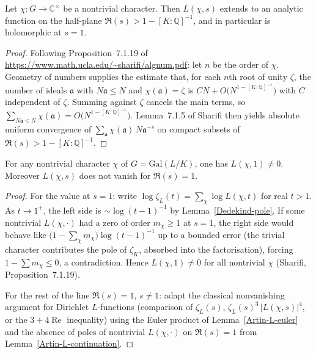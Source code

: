 {\begin{lemma}\label{Artin-L-continuation}
Let $\chi : G \to \mathbb{C}^\times$ be a nontrivial character.  Then $L(\chi,s)$ extends to an
analytic function on the half-plane $\Re(s) > 1 - [K:\mathbb{Q}]^{-1}$, and in particular is
holomorphic at $s=1$.
\end{lemma}

\begin{proof}
Following Proposition~7.1.19 of \url{https://www.math.ucla.edu/~sharifi/algnum.pdf}: let $n$
be the order of $\chi$.  Geometry of numbers supplies the estimate that, for each $n$th root of
unity $\zeta$, the number of ideals $\mathfrak{a}$ with $N\mathfrak{a} \leq N$ and
$\chi(\mathfrak{a})=\zeta$ is $CN + O\bigl(N^{1-[K:\mathbb{Q}]^{-1}}\bigr)$ with $C$ independent of
$\zeta$.  Summing against $\zeta$ cancels the main terms, so
$\sum_{N\mathfrak{a}\leq N} \chi(\mathfrak{a}) = O\bigl(N^{1-[K:\mathbb{Q}]^{-1}}\bigr)$.
Lemma~7.1.5 of Sharifi then yields absolute uniform convergence of
$\sum_{\mathfrak{a}} \chi(\mathfrak{a})\, N\mathfrak{a}^{-s}$ on compact subsets of
$\Re(s) > 1 - [K:\mathbb{Q}]^{-1}$.
\end{proof}

\begin{lemma}\label{Dedekind-nonvanishing}
For any nontrivial character $\chi$ of $G = \mathrm{Gal}(L/K)$, one has $L(\chi,1) \neq 0$.
Moreover $L(\chi,s)$ does not vanish for $\Re(s)=1$.
\end{lemma}

\begin{proof}
For the value at $s=1$: write $\log\zeta_L(t) = \sum_\chi \log L(\chi,t)$ for real $t>1$.
As $t\to 1^+$, the left side is $\sim \log(t-1)^{-1}$ by Lemma~\ref{Dedekind-pole}.  If some
nontrivial $L(\chi,\cdot)$ had a zero of order $m_\chi \geq 1$ at $s=1$, the right side would
behave like $\bigl(1 - \sum_\chi m_\chi\bigr)\log(t-1)^{-1}$ up to a bounded error
(the trivial character contributes the pole of $\zeta_K$, absorbed into the factorisation),
forcing $1-\sum m_\chi \leq 0$, a contradiction.  Hence $L(\chi,1)\neq 0$ for all nontrivial
$\chi$ (Sharifi, Proposition~7.1.19).

For the rest of the line $\Re(s)=1$, $s\neq 1$: adapt the classical nonvanishing argument for
Dirichlet $L$-functions (comparison of $\zeta_L(s)$, $\zeta_L(s)^3\,|L(\chi,s)|^4$, or the
$3+4\operatorname{Re}$ inequality) using the Euler product of Lemma~\ref{Artin-L-euler} and the
absence of poles of nontrivial $L(\chi,\cdot)$ on $\Re(s)=1$ from
Lemma~\ref{Artin-L-continuation}.
\end{proof}

}
